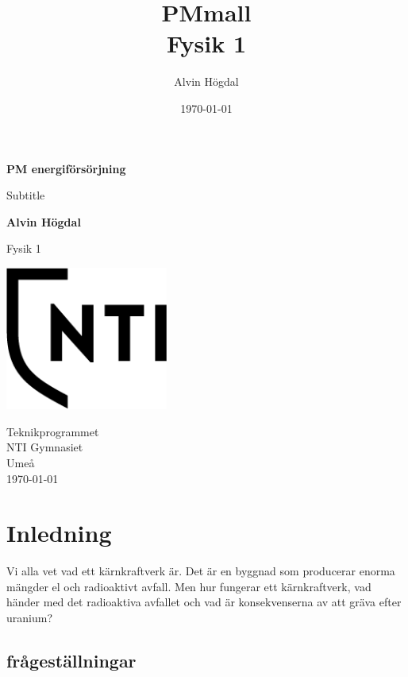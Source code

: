 \documentclass[11p]{article}
\title{PMmall \\ \small Fysik 1}
\author{Alvin Högdal }
\date{\today}
\begin{document}
    \begin{titlepage}
        \begin{center}
            \vspace*{1cm}

            \Huge
            \textbf{PM energiförsörjning }

            \vspace{0.5cm}
            \LARGE
            Subtitle

            \vspace{1.5cm}

            \textbf{Alvin Högdal}

            \vfill


            Fysik 1

            \vspace{0.8cm}

            \includegraphics[width=0.4\textwidth]{../images/NTI Gymnasiet_Symbol_print_svart.png}

            \Large
            Teknikprogrammet\\
            NTI Gymnasiet\\
            Umeå\\
            \today

        \end{center}
    \end{titlepage}
    \tableofcontents
    \newpage

    \section{Inledning}
    Vi alla vet vad ett kärnkraftverk är.
    Det är en byggnad som producerar enorma mängder el och radioaktivt avfall.
    Men hur fungerar ett kärnkraftverk, vad händer med det radioaktiva avfallet och vad är konsekvenserna av att gräva efter uranium?
    \subsection{frågeställningar}
\end{document}
